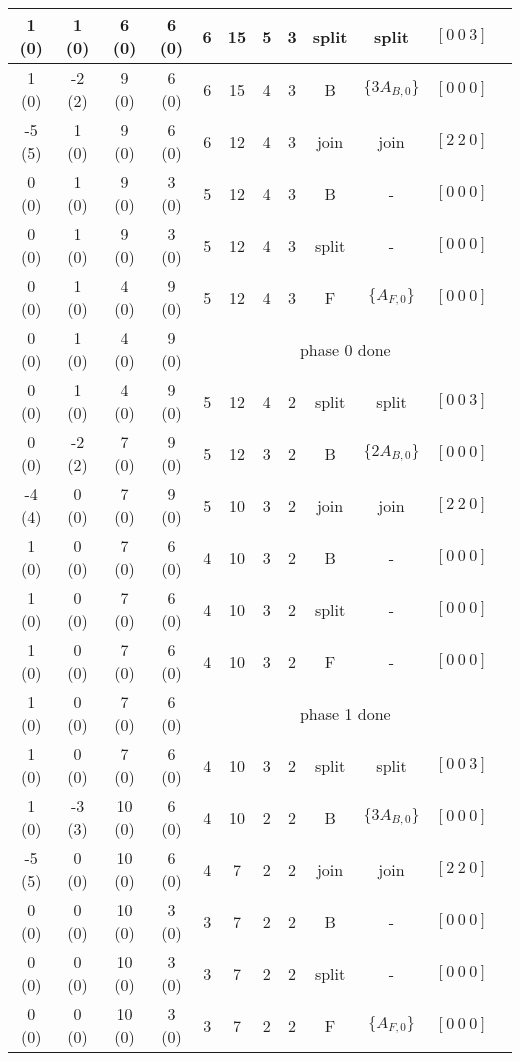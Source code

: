 \begin{table}
\begin{tabular}{|c|c|c|c|c|c|c|c|c|c|c|c|}
\hline 1 (0) & 1 (0) & 6 (0) & 6 (0) & 6 & 15 & 5 & 3 & split & split & $[0\ 0\ 3]$ \\
\hline 1 (0) & -2 (2) & 9 (0) & 6 (0) & 6 & 15 & 4 & 3 & B & $\{3A_{B,0}\}$ & $[0\ 0\ 0]$ \\
\hline -5 (5) & 1 (0) & 9 (0) & 6 (0) & 6 & 12 & 4 & 3 & join & join & $[2\ 2\ 0]$ \\
\hline 0 (0) & 1 (0) & 9 (0) & 3 (0) & 5 & 12 & 4 & 3 & B & - & $[0\ 0\ 0]$ \\
\hline 0 (0) & 1 (0) & 9 (0) & 3 (0) & 5 & 12 & 4 & 3 & split & - & $[0\ 0\ 0]$ \\
\hline 0 (0) & 1 (0) & 4 (0) & 9 (0) & 5 & 12 & 4 & 3 & F & $\{A_{F,0}\}$ & $[0\ 0\ 0]$ \\

\hline 0 (0) &  1 (0) &  4 (0) &   9 (0) & \multicolumn{7}{|c|}{phase 0 done} \\

\hline 0 (0) & 1 (0) & 4 (0) & 9 (0) & 5 & 12 & 4 & 2 & split & split & $[0\ 0\ 3]$ \\
\hline 0 (0) & -2 (2) & 7 (0) & 9 (0) & 5 & 12 & 3 & 2 & B & $\{2A_{B,0}\}$ & $[0\ 0\ 0]$ \\
\hline -4 (4) & 0 (0) & 7 (0) & 9 (0) & 5 & 10 & 3 & 2 & join & join & $[2\ 2\ 0]$ \\
\hline 1 (0) & 0 (0) & 7 (0) & 6 (0) & 4 & 10 & 3 & 2 & B & - & $[0\ 0\ 0]$ \\
\hline 1 (0) & 0 (0) & 7 (0) & 6 (0) & 4 & 10 & 3 & 2 & split & - & $[0\ 0\ 0]$ \\
\hline 1 (0) & 0 (0) & 7 (0) & 6 (0) & 4 & 10 & 3 & 2 & F & - & $[0\ 0\ 0]$ \\

\hline 1 (0) & 0 (0) & 7 (0) & 6 (0) & \multicolumn{7}{|c|}{phase 1 done} \\

\hline 1 (0) & 0 (0) & 7 (0) & 6 (0) & 4 & 10 & 3 & 2 & split & split & $[0\ 0\ 3]$ \\
\hline 1 (0) & -3 (3) & 10 (0) & 6 (0) & 4 & 10 & 2 & 2 & B & $\{3A_{B,0}\}$ & $[0\ 0\ 0]$ \\
\hline -5 (5) & 0 (0) & 10 (0) & 6 (0) & 4 & 7 & 2 & 2 & join & join & $[2\ 2\ 0]$ \\
\hline 0 (0) & 0 (0) & 10 (0) & 3 (0) & 3 & 7 & 2 & 2 & B & - & $[0\ 0\ 0]$ \\
\hline 0 (0) & 0 (0) & 10 (0) & 3 (0) & 3 & 7 & 2 & 2 & split & - & $[0\ 0\ 0]$ \\
\hline 0 (0) & 0 (0) & 10 (0) & 3 (0) & 3 & 7 & 2 & 2 & F & $\{A_{F,0}\}$ & $[0\ 0\ 0]$ \\


\end{tabular}
\end{table}
